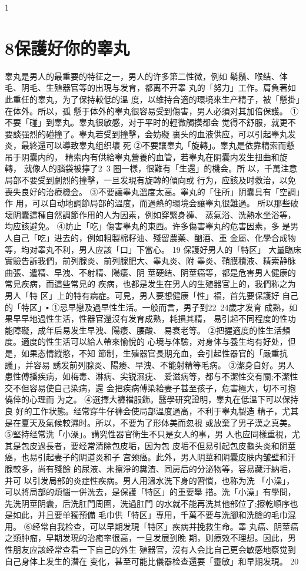 \documentclass[12pt,UTF8]{ctexbook}
\begin{document}
1\section{8保護好你的睾丸}
睾丸是男人的最重要的特征之一，男人的许多第二性微，例如
鬍鬚、喉结、体毛、阴毛、生殖器官等的出現与发育，都离不开睾
丸的「努力」工作。肩負著如此重任的睾丸，为了保持較低的溫
度，以维持合適的環境來生产精子，被「懸掛」在体外。所以，孤
懸于体外的睾丸很容易受到傷害，男人必須对其加倍保護。
①不要「碰」到睾丸。睾丸很敏感，对于平时的輕微觸摸都会
觉得不舒服，就更不要談强烈的碰撞了。睾丸若受到撞擊，会妨礙
裏头的血液供应，可以引起睾丸发炎，最終還可以導致睾丸组织壞
死
②不要讓睾丸「旋轉」。睾丸是依靠精索而懸吊于阴囊内的，
精索内有供給睾丸營養的血管，若睾丸在阴囊内发生扭曲和旋轉，
就像人的腦袋被擰了2~3 圈一樣，很難有「生還」的機会。所
以，千萬注意局部不要受到劇烈的撞擊，一旦发現有旋轉的傾向或
行为，应該及时救治，以免喪失良好的治療機会。
③不要讓睾丸溫度太高。睾丸的「住所」阴囊具有「空調」作
用，可以自动地調節局部的溫度，而過熱的環境会讓睾丸很難過。
所以那些破壞阴囊這種自然調節作用的人为因素，例如穿緊身褲、
蒸氣浴、洗熱水坐浴等，均应該避免。
④防止「吃」傷害睾丸的東西。许多傷害睾丸的危害因素，多
是男人自己「吃」进去的，例如粗製棉籽油、殘留農藥、酗酒、重
金屬、化學合成物等，均对睾丸不利，男人应該「口」下當心。
19 保護好男人的「特区」
大量臨床實驗告訴我們，前列腺炎、前列腺肥大、睾丸炎、附
睾炎、鞘膜積液、精索静脉曲張、遣精、早洩、不射精、陽痿、阴
莖硬结、阴莖癌等，都是危害男人健康的常見疾病，而這些常見的
疾病，也都是发生在男人的生殖器官上的，我們称之为男人「特
区」上的特有病症。可見，男人要想健康「性」福，首先要保護好
自己的「特区」▪
①忌早戀及過早性生活。一般而言，男子到22~24歲才发育
成熟，如果早早地過性生活，性器官還沒有发育成熟，耗損其精，
易引起不同程度的性功能障礙，成年后易发生早洩、陽痿、腰酸、
易衰老等。
②把握適度的性生活頻度。適度的性生活可以給人帶來愉悅的
心境与体驗，对身体与養生均有好处，但是，如果态情縱慾，不知
節制，生殖器官長期充血，会引起性器官的「嚴重抗議」，并容易
誘发前列腺炎、陽痿、早洩、不能射精等毛病。
③潔身自好。男人患性傅播疾病，如梅毒、淋病、尖锐濕疣、
爱滋病等，都与不潔性交有關;不潔性交不但容易使自己染病，還
会把疾病傅染耠妻子甚至孩子，危害極大，切不可抱僥倖的心理而
为之。
④選擇大褲襠服飾。醫學研究證明，睾丸在低溫下可以保持良
好的工作状態。经常穿牛仔褲会使局部溫度過高，不利于睾丸製造
精子，尤其是在夏天及氣候較濕时。所以，不要为了形体美而忽視
或放棄了男子漢之真美。
⑤堅持经常洗「小澡」。講究性器官衛生不只是女人的事，男
人也应同樣重視，尤其是包皮過長者，要经常清除包皮垢，因为包
皮垢不但易引起包皮龜头炎和阴莖癌，也易引起妻子的阴道炎和子
宫颈癌。此外，男人阴莖和阴囊皮肤内皱壁和汗腺較多，尚有殘餘
的尿液、未擦淨的糞渣、同房后的分泌物等，容易藏汙納垢，并可
以引发局部的炎症性疾病。男人用溫水洗下身的習慣，也称为洗
「小澡」，可以將局部的煩惱一併洗去，是保護「特区」的重要舉
措。洗「小澡」有學問，先洗阴莖阴囊，后洗肛門周圍，洗過肛門
的水就不能再洗其他部位了;擦乾順序也是如此，并且要单獨預備
毛巾供「特区」專用，千萬不要与洗腳和洗臉的毛巾混用。
⑥经常自我检查，可以早期发現「特区」疾病并挽救生命。睾
丸癌、阴莖癌之類肿瘤，早期发現的治癒率很高，一旦发展到晚
期，则療效不理想。因此，男性朋友应該经常查看一下自己的外生
殖器官，沒有人会比自己更会敏感地察觉到自己身体上发生的潛在
变化，甚至可能比儀器检查還要「靈敏」和早期发現。
20
\end{document}
